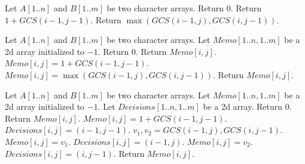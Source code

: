 \begin{algorithmic}[1]
\State Let $A[1..n]$ and $B[1..m]$ be two character arrays.
		\State Return $0$.
		\State Return $1 + GCS(i-1,j-1)$.
	\Else 
		\State Return $\max(GCS(i-1,j),GCS(i,j-1))$.
	\EndIf
\EndProcedure
\end{algorithmic}
\begin{algorithmic}[1]
\State Let $A[1..n]$ and $B[1..m]$ be two character arrays.
\State Let $Memo[1..n,1..m]$ be a 2d array initialized to $-1$.
		\State Return $0$.
		\State Return $Memo[i,j]$.
		\State $Memo[i,j] = 1 + GCS(i-1,j-1)$.
	\Else 
		\State $Memo[i,j] = \max(GCS(i-1,j),GCS(i,j-1))$.
	\EndIf
	\State Return $Memo[i,j]$.
\EndProcedure
\end{algorithmic}
\begin{algorithmic}[1]
\State Let $A[1..n]$ and $B[1..m]$ be two character arrays.
\State Let $Memo[1..n,1..m]$ be a 2d array initialized to $-1$.
\State Let $Decisions[1..n,1..m]$ be a 2d array.
		\State Return $0$.
		\State Return $Memo[i,j]$.
		\State $Memo[i,j] = 1 + GCS(i-1,j-1)$.
		\State $Decisions[i,j] = (i-1,j-1)$.
	\Else 
		\State $v_1, v_2 = GCS(i-1,j), GCS(i,j-1)$.
			\State $Memo[i,j] = v_1$.
			\State $Decisions[i,j] = (i-1,j)$.
		\Else
			\State $Memo[i,j] = v_2$.
			\State $Decisions[i,j] = (i,j-1)$.
		\EndIf
	\EndIf
	\State Return $Memo[i,j]$.
\EndProcedure
\end{algorithmic}
